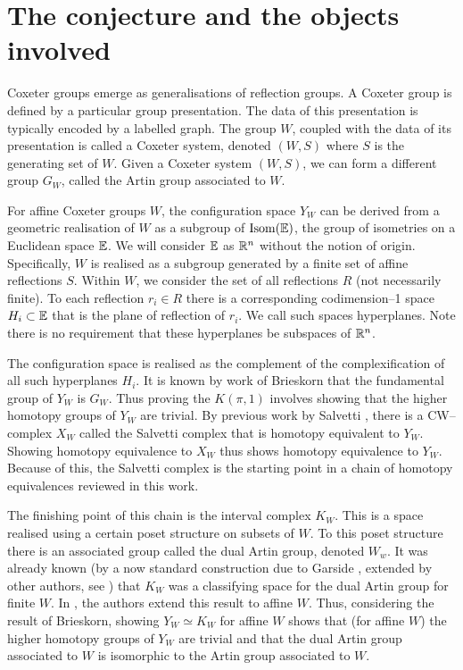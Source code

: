 \documentclass[class=guthesis, crop=false]{standalone}
\begin{document}
\section{The conjecture and the objects involved}
Coxeter groups emerge as generalisations of reflection groups. A Coxeter group is defined by a particular group presentation. The data of this presentation is typically encoded by a labelled graph. The group $W$, coupled with the data of its presentation is called a Coxeter system, denoted $(W,S)$ where $S$ is the generating set of $W$. Given a Coxeter system $(W,S)$, we can form a different group $G_W$, called the Artin group associated to $W$.

For affine Coxeter groups $W$, the configuration space $Y_W$ can be derived from a geometric realisation of $W$ as a subgroup of $\operatorname{Isom}(\mathbb{E})$, the group of isometries on a Euclidean space $\mathbb{E}$. We will consider $\mathbb{E}$ as $\mathbb{R}^n$ without the notion of origin. Specifically, $W$ is realised as a subgroup generated by a finite set of affine reflections $S$. Within $W$, we consider the set of all reflections $R$ (not necessarily finite). To each reflection $r_i \in R$ there is a corresponding codimension--1 space $H_i \subset \mathbb{E}$ that is the plane of reflection of $r_i$. We call such spaces hyperplanes. Note there is no requirement that these hyperplanes be subspaces of $\mathbb{R}^n$.

The configuration space is realised as the complement of the complexification of all such hyperplanes $H_i$. It is known by work of Brieskorn \cite{brieskorn_fundamentalgruppe_1971} that the fundamental group of $Y_W$ is $G_W$. Thus proving the $K(\pi,1)$ involves showing that the higher homotopy groups of $Y_W$ are trivial. By previous work by Salvetti \cite{salvetti_topology_1987,salvetti_homotopy_1994}, there is a CW--complex $X_W$ called the Salvetti complex that is homotopy equivalent to $Y_W$. Showing homotopy equivalence to $X_W$ thus shows homotopy equivalence to $Y_W$. Because of this, the Salvetti complex is the starting point in a chain of homotopy equivalences reviewed in this work.

The finishing point of this chain is the interval complex $K_W$. This is a space realised using a certain poset structure on subsets of $W$. To this poset structure there is an associated group called the dual Artin group, denoted $W_w$. It was already known (by a now standard construction due to Garside \cite{garside_braid_1969}, extended by other authors, see \cite{charney_etal_bestvina_2002}) that $K_W$ was a classifying space for the dual Artin group for finite $W$. In \cite{paolini_salvetti_kpi1_2021}, the authors extend this result to affine $W$. Thus, considering the result of Brieskorn, showing $Y_W \simeq K_W$ for affine $W$ shows that (for affine $W$) the higher homotopy groups of $Y_W$ are trivial and that the dual Artin group associated to $W$ is isomorphic to the Artin group associated to $W$.
\end{document}
